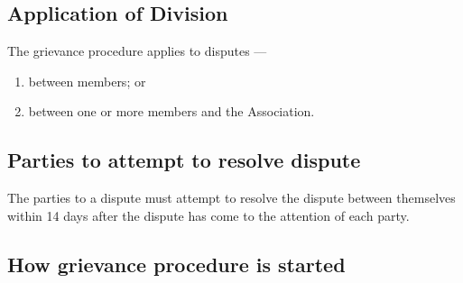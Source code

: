 \documentclass[../constitution.tex]{subfiles}
\begin{document}
\hypertarget{application-of-division}{%
\subsection{Application of Division}\label{application-of-division}}

The grievance procedure applies to disputes ---

\begin{enumerate}
  \def\labelenumi{\alph{enumi})}
  \setcounter{enumi}{0}
  \item between members; or
  \item between one or more members and the Association.
\end{enumerate}

\hypertarget{parties-to-attempt-to-resolve-dispute}{%
\subsection{Parties to attempt to resolve dispute}\label{parties-to-attempt-to-resolve-dispute}}

The parties to a dispute must attempt to resolve the dispute between themselves within 14 days after the dispute has come to the attention of each party.

\hypertarget{how-grievance-procedure-is-started}{%
\subsection{How grievance procedure is started}\label{how-grievance-procedure-is-started}}
\end{document}

